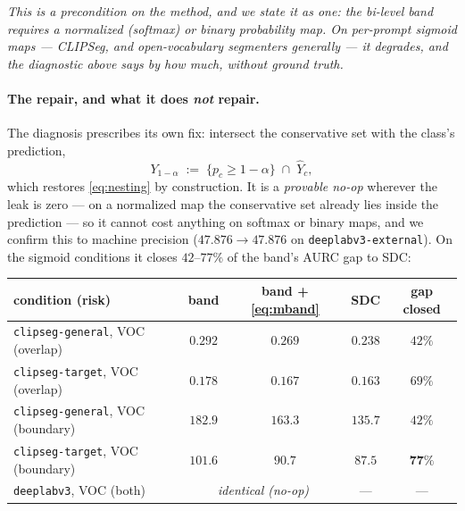 \documentclass[11pt]{article}
\theoremstyle{remark}
\newcommand{\Yhat}{\widehat{Y}}
\newcommand{\Yhi}{Y_{1-\alpha}}
\begin{document}
\emph{This is a precondition on the method, and we state it as one: the bi-level band
requires a normalized (softmax) or binary probability map. On per-prompt sigmoid maps
--- CLIPSeg, and open-vocabulary segmenters generally --- it degrades, and the
diagnostic above says by how much, without ground truth.}

\paragraph{The repair, and what it does \emph{not} repair.} The diagnosis prescribes
its own fix: intersect the conservative set with the class's prediction,
\begin{equation}\label{eq:mband}
\Yhi \;:=\; \{p_c \ge 1-\alpha\} \;\cap\; \Yhat_c ,
\end{equation}
which restores \eqref{eq:nesting} by construction. It is a \emph{provable no-op}
wherever the leak is zero --- on a normalized map the conservative set already lies
inside the prediction --- so it cannot cost anything on softmax or binary maps, and we
confirm this to machine precision ($47.876 \to 47.876$ on \texttt{deeplabv3-external}).
On the sigmoid conditions it closes $42$--$77\%$ of the band's AURC gap to SDC:

\begin{center}
\small
\begin{tabular}{lcccc}
\toprule
condition (risk) & band & band + \eqref{eq:mband} & SDC & gap closed \\
\midrule
\texttt{clipseg-general}, VOC (overlap)  & $0.292$ & $0.269$ & $0.238$ & $42\%$ \\
\texttt{clipseg-target},  VOC (overlap)  & $0.178$ & $0.167$ & $0.163$ & $69\%$ \\
\texttt{clipseg-general}, VOC (boundary) & $182.9$ & $163.3$ & $135.7$ & $42\%$ \\
\texttt{clipseg-target},  VOC (boundary) & $101.6$ & $90.7$  & $87.5$  & $\mathbf{77\%}$ \\
\texttt{deeplabv3}, VOC (both)           & \multicolumn{2}{c}{\emph{identical (no-op)}} & --- & --- \\
\bottomrule
\end{tabular}
\end{center}
\end{document}

